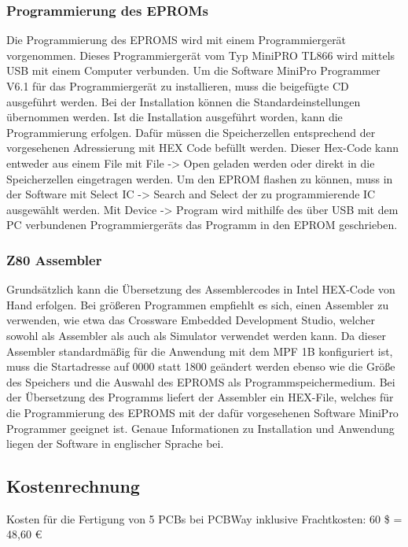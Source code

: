\subsubsection{Programmierung des EPROMs}
Die Programmierung des EPROMS wird mit einem Programmiergerät vorgenommen. Dieses Programmiergerät vom Typ MiniPRO TL866 wird mittels USB mit einem Computer verbunden. Um die Software MiniPro Programmer V6.1 für das Programmiergerät zu installieren, muss die beigefügte CD ausgeführt werden. Bei der Installation können die Standardeinstellungen übernommen werden. Ist die Installation ausgeführt worden, kann die Programmierung erfolgen. Dafür müssen die Speicherzellen entsprechend der vorgesehenen Adressierung mit HEX Code befüllt werden. Dieser Hex-Code kann entweder aus einem File mit File -> Open geladen werden oder direkt in die Speicherzellen eingetragen werden. Um den EPROM flashen zu können, muss in der Software mit Select IC -> Search and Select der zu programmierende IC ausgewählt werden.  Mit Device -> Program wird mithilfe des über USB mit dem PC verbundenen Programmiergeräts das Programm in den EPROM geschrieben.

\subsubsection{Z80 Assembler}
Grundsätzlich kann die Übersetzung des Assemblercodes in Intel HEX-Code von Hand erfolgen. Bei größeren Programmen empfiehlt es sich, einen Assembler zu verwenden, wie etwa das Crossware Embedded Development Studio, welcher sowohl als Assembler als auch als Simulator verwendet werden kann. Da dieser Assembler standardmäßig für die Anwendung mit dem MPF 1B konfiguriert ist, muss die Startadresse auf 0000 statt 1800 geändert werden ebenso wie die Größe des Speichers und die Auswahl des EPROMS als Programmspeichermedium. Bei der Übersetzung des Programms liefert der Assembler ein HEX-File, welches für die Programmierung des EPROMS mit der dafür vorgesehenen Software MiniPro Programmer geeignet ist. Genaue Informationen zu Installation und Anwendung liegen der Software in englischer Sprache bei.

\subsection{Kostenrechnung}
\label{sec:z80-kostenrechnung}
Kosten für die Fertigung von 5 PCBs bei PCBWay inklusive Frachtkosten:
60 \$ = 48,60 €

